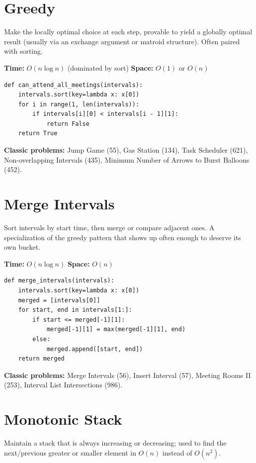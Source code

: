 \documentclass[11pt]{article}
\newcommand{\complexity}[2]{\textbf{Time:} #1 \quad \textbf{Space:} #2}
\begin{document}
\section{Greedy}

Make the locally optimal choice at each step, provable to yield a globally
optimal result (usually via an exchange argument or matroid structure).
Often paired with sorting.

\complexity{$O(n \log n)$ (dominated by sort)}{$O(1)$ or $O(n)$}

\begin{lstlisting}
def can_attend_all_meetings(intervals):
    intervals.sort(key=lambda x: x[0])
    for i in range(1, len(intervals)):
        if intervals[i][0] < intervals[i - 1][1]:
            return False
    return True
\end{lstlisting}

\textbf{Classic problems:} Jump Game (55), Gas Station (134), Task
Scheduler (621), Non-overlapping Intervals (435), Minimum Number of
Arrows to Burst Balloons (452).

\section{Merge Intervals}

Sort intervals by start time, then merge or compare adjacent ones. A
specialization of the greedy pattern that shows up often enough to deserve
its own bucket.

\complexity{$O(n \log n)$}{$O(n)$}

\begin{lstlisting}
def merge_intervals(intervals):
    intervals.sort(key=lambda x: x[0])
    merged = [intervals[0]]
    for start, end in intervals[1:]:
        if start <= merged[-1][1]:
            merged[-1][1] = max(merged[-1][1], end)
        else:
            merged.append([start, end])
    return merged
\end{lstlisting}

\textbf{Classic problems:} Merge Intervals (56), Insert Interval (57),
Meeting Rooms II (253), Interval List Intersections (986).

\section{Monotonic Stack}

Maintain a stack that is always increasing or decreasing; used to find the
next/previous greater or smaller element in $O(n)$ instead of $O(n^2)$.
\end{document}
